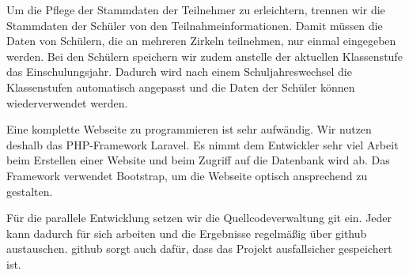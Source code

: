Um die Pflege der Stammdaten der Teilnehmer zu erleichtern, trennen wir die Stammdaten der Schüler von den Teilnahmeinformationen. Damit müssen die Daten von Schülern, die an mehreren Zirkeln teilnehmen, nur einmal eingegeben werden. Bei den Schülern speichern wir zudem anstelle der aktuellen Klassenstufe das Einschulungsjahr. Dadurch wird nach einem Schuljahreswechsel die Klassenstufen automatisch angepasst und die Daten der Schüler können wiederverwendet werden.

Eine komplette Webseite zu programmieren ist sehr aufwändig. Wir nutzen deshalb das PHP-Framework Laravel. Es nimmt dem Entwickler sehr viel Arbeit beim Erstellen einer Website und beim Zugriff auf die Datenbank wird ab. Das Framework verwendet Bootstrap, um die Webseite optisch ansprechend zu gestalten. \cite{Bootstrap} \cite{laravel}

Für die parallele Entwicklung setzen wir die Quellcodeverwaltung git ein. Jeder kann dadurch für sich arbeiten und die Ergebnisse regelmäßig über github austauschen. github sorgt auch dafür, dass das Projekt ausfallsicher gespeichert ist.